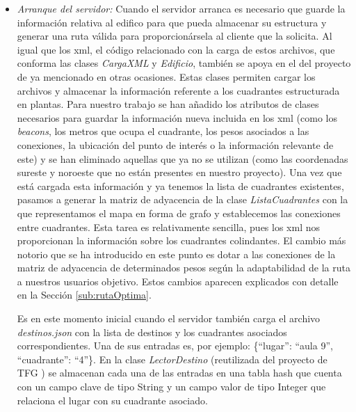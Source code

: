 \begin{itemize}
	\item \textit{Arranque del servidor:} Cuando el servidor arranca es necesario que guarde la información relativa al edifico para que pueda almacenar su estructura y generar una ruta válida para proporcionársela al cliente que la solicita. Al igual que los xml, el código relacionado con la carga de estos archivos, que conforma las clases \textit{CargaXML} y \textit{Edificio}, también se apoya en el del proyecto de \cite{TFGguia} ya mencionado en otras ocasiones. Estas clases permiten cargar los archivos y almacenar la información referente a los cuadrantes estructurada en plantas. Para nuestro trabajo se han añadido los atributos de clases necesarios para guardar la información nueva incluida en los xml (como los \textit{beacons}, los metros que ocupa el cuadrante, los pesos asociados a las conexiones, la ubicación del punto de interés o la información relevante de este) y se han eliminado aquellas que ya no se utilizan (como las coordenadas sureste y noroeste que no están presentes en nuestro proyecto). Una vez que está cargada esta información y ya tenemos la lista de cuadrantes existentes, pasamos a generar la matriz de adyacencia de la clase \textit{ListaCuadrantes} con la que representamos el mapa en forma de grafo y establecemos las conexiones entre cuadrantes. Esta tarea es relativamente sencilla, pues los xml nos proporcionan la información sobre los cuadrantes colindantes. El cambio más notorio que se ha introducido en este punto es dotar a las conexiones de la matriz de adyacencia de determinados pesos según la adaptabilidad de la ruta a nuestros usuarios objetivo. Estos cambios aparecen explicados con detalle en la Sección \ref{sub:rutaOptima}. 
	
	Es en este momento inicial cuando el servidor también carga el archivo \textit{destinos.json} con la lista de destinos y los cuadrantes asociados correspondientes. Una de sus entradas es, por ejemplo: \{``lugar'': ``aula 9'', ``cuadrante'': ``4''\}. En la clase \textit{LectorDestino} (reutilizada del proyecto de TFG \citep{TFGguia}) se almacenan cada una de las entradas en una tabla hash que cuenta con un campo clave de tipo String y un campo valor de tipo Integer que relaciona el lugar con su cuadrante asociado.
	

\end{itemize}
